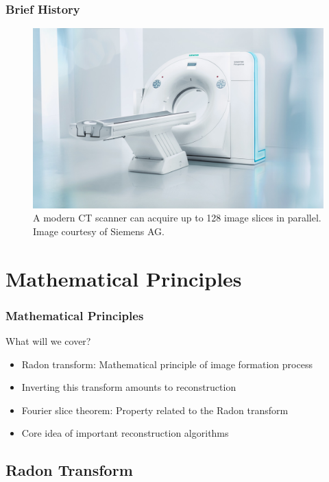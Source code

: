 \begin{frame}
	\frametitle{Brief History}

	\begin{figure}[tb]
		\centering
		\includegraphics[height=0.75\textheight]{images/somatom_perspective}
		\caption{A modern CT scanner can acquire up to 128 image slices in parallel. Image courtesy of Siemens AG.}%
		\label{fig:ct_hist_2}
	\end{figure}

\end{frame}

\section{Mathematical Principles}%
\label{sec:ct_mat}

\begin{frame}
	\frametitle{Mathematical Principles}

	What will we cover?
	\vspace{0.3cm}

	\begin{itemize}
		\setlength\itemsep{0.3cm}
		\item Radon transform: Mathematical principle of image formation process
		\item Inverting this transform amounts to reconstruction
		\item Fourier slice theorem: Property related to the Radon transform
		\item Core idea of important reconstruction algorithms
	\end{itemize}

\end{frame}


\subsection{Radon Transform}%
\label{sub:ct_radon}

